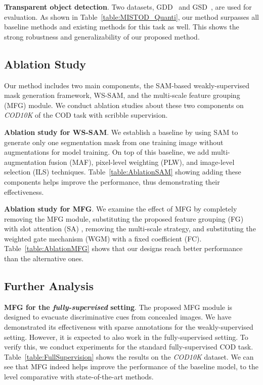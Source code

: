 \noindent\textbf{Transparent object detection}.
Two datasets, GDD~\cite{mei2020don} and GSD~\cite{lin2021rich}, are used for evaluation. As shown in Table~\ref{table:MISTOD_Quanti}, our method surpasses all baseline methods and existing methods for this task as well. This shows the strong robustness and generalizability of our proposed method. 

\subsection{Ablation Study} \vspace{-1mm}
Our method includes two main components, the SAM-based weakly-supervised mask generation framework, WS-SAM, and the multi-scale feature grouping (MFG) module. We conduct ablation studies about these two components on \textit{COD10K} of the COD task with scribble supervision. 

\noindent \textbf{Ablation study for WS-SAM}. 
We establish a baseline by using SAM to generate only one segmentation mask from one training image without augmentations for model training. On top of this baseline, we add multi-augmentation fusion (MAF),  pixel-level weighting (PLW), and image-level selection (ILS) techniques. Table~\ref{table:AblationSAM} showing adding these components helps improve the performance, thus demonstrating their effectiveness.  

\noindent \textbf{Ablation study for MFG}.
We examine the effect of MFG by completely removing the MFG module, substituting the proposed feature grouping (FG) with slot attention (SA) \cite{locatello2020object}, removing the multi-scale strategy, and substituting the weighted gate mechanism (WGM) with a fixed coefficient (FC). Table~\ref{table:AblationMFG} shows that our designs reach better performance than the alternative ones. 

\subsection{Further Analysis}\vspace{-1mm}

\noindent\textbf{MFG for the \emph{fully-supervised} setting}.
The proposed MFG module is designed to evacuate discriminative cues from concealed images. We have demonstrated its effectiveness with sparse annotations for the weakly-supervised setting. However, it is expected to also work in the fully-supervised setting. To verify this,  we conduct experiments for the standard fully-supervised COD task. Table~\ref{table:FullSupervision} shows the results on the \textit{COD10K} dataset. We can see that MFG indeed helps improve the performance of the baseline model, to the level comparative with state-of-the-art methods.  

